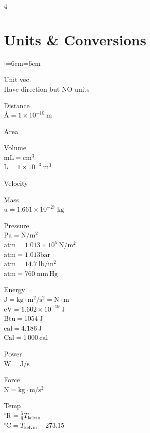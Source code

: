 \documentclass[letterpaper,landscape,10pt]{article}
\newenvironment{litemize}
{\begin{list}{$\cdot$}{\leftmargin=6em\labelwidth=6em}
	\setlength{\itemsep}{0pt}
	\setlength{\parskip}{0pt}
	\setlength{\parsep}{0pt}}
{\end{list}}
\begin{document}
{\begin{multicols}{4}
\section*{Units \& Conversions}
	\begin{litemize}
		\item[Unit vec.] \ \\
			Have direction but NO units
	    \item[Distance] \ \\
		  \AA $= 1 \times 10^{-10} \: \mathrm{m} $
	    \item[Area] \ \\
	    \item[Volume] \ \\
		  $\mathrm{mL}=\mathrm{cm^3}$ \\
		  $\mathrm{L}=1\times10^{-3}\:\mathrm{m^3}$
		\item[Velocity] \ \\
		\item[Mass] \ \\
		  $\mathrm{u = 1.661 \times 10^{-27}\:kg}$
		\item[Pressure] \ \\
		  $\mathrm{Pa = N/m^2}$ \\
		  $\mathrm{atm} = 1.013 \times 10^{5}\:\mathrm{N/m^2}$ \\
		  $\mathrm{atm} = 1.013 \mathrm{bar}$ \\
		  $\mathrm{atm} = 14.7\;\mathrm{lb/in^2}$ \\
		  $\mathrm{atm} = 760\;\mathrm{mm\,Hg}$
		\item[Energy] \ \\
		  $\mathrm{J = kg \cdot m^2 / s^2 = N \cdot m}$ \\
		  $\mathrm{eV = 1.602 \times 10^{-19}\:J}$ \\
		  $\mathrm{Btu = 1054 \:J}$ \\
		  $\mathrm{cal = 4.186 \:J}$ \\
		  $\mathrm{Cal = 1\,000 \:cal}$
		\item[Power] \ \\
		  $\mathrm{W = J/s}$
		\item[Force] \ \\
		  $\mathrm{N = kg \cdot m/s^2}$
		\item[Temp] \ \\
		  $\mathrm{^\circ R} = \frac{5}{9}T_{\mathrm{kelvin}}$ \\
		  $\mathrm{^\circ C} = T_{\mathrm{kelvin}}-273.15$ \\

\end{litemize}
\end{multicols}}
\end{document}
